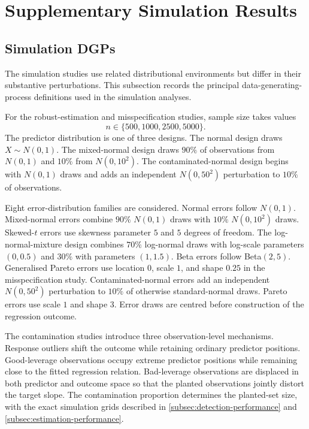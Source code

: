 \documentclass[../main.tex]{subfiles}
\begin{document}
\section{Supplementary Simulation Results}
\label{app:simulation}

\subsection{Simulation DGPs}
\label{app:simulation-dgps}

The simulation studies use related distributional environments but differ in their substantive perturbations. This subsection records the principal data-generating-process definitions used in the simulation analyses.

For the robust-estimation and misspecification studies, sample size takes values
\[
n\in\{500,1000,2500,5000\}.
\]
The predictor distribution is one of three designs. The normal design draws \(X\sim N(0,1)\). The mixed-normal design draws \(90\%\) of observations from \(N(0,1)\) and \(10\%\) from \(N(0,10^2)\). The contaminated-normal design begins with \(N(0,1)\) draws and adds an independent \(N(0,50^2)\) perturbation to \(10\%\) of observations.

Eight error-distribution families are considered. Normal errors follow \(N(0,1)\). Mixed-normal errors combine \(90\%\) \(N(0,1)\) draws with \(10\%\) \(N(0,10^2)\) draws. Skewed-\(t\) errors use skewness parameter \(5\) and \(5\) degrees of freedom. The log-normal-mixture design combines \(70\%\) log-normal draws with log-scale parameters \((0,0.5)\) and \(30\%\) with parameters \((1,1.5)\). Beta errors follow Beta\((2,5)\). Generalised Pareto errors use location \(0\), scale \(1\), and shape \(0.25\) in the misspecification study. Contaminated-normal errors add an independent \(N(0,50^2)\) perturbation to \(10\%\) of otherwise standard-normal draws. Pareto errors use scale \(1\) and shape \(3\). Error draws are centred before construction of the regression outcome.

The contamination studies introduce three observation-level mechanisms. Response outliers shift the outcome while retaining ordinary predictor positions. Good-leverage observations occupy extreme predictor positions while remaining close to the fitted regression relation. Bad-leverage observations are displaced in both predictor and outcome space so that the planted observations jointly distort the target slope. The contamination proportion determines the planted-set size, with the exact simulation grids described in \autoref{subsec:detection-performance} and \autoref{subsec:estimation-performance}.
\end{document}
